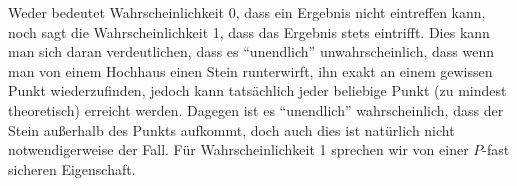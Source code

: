 \begin{Wichtig}
Weder bedeutet Wahrscheinlichkeit 0, dass ein Ergebnis nicht eintreffen kann, noch sagt die Wahrscheinlichkeit 1, dass das Ergebnis stets eintrifft. Dies kann man sich daran verdeutlichen, dass es "`unendlich"' unwahrscheinlich, dass wenn man von einem Hochhaus einen Stein runterwirft, ihn exakt an einem gewissen Punkt wiederzufinden, jedoch kann tatsächlich jeder beliebige Punkt (zu mindest theoretisch) erreicht werden. Dagegen ist es "`unendlich"' wahrscheinlich, dass der Stein außerhalb des Punkts aufkommt, doch auch dies ist natürlich nicht notwendigerweise der Fall.  Für Wahrscheinlichkeit 1 sprechen wir von einer $ P $-fast sicheren Eigenschaft.  
\end{Wichtig}









